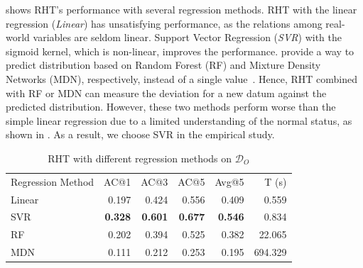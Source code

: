  shows RHT's performance with several regression methods.
RHT with the linear regression (\textit{Linear}) has unsatisfying performance, as the relations among real-world variables are seldom linear.
Support Vector Regression (\textit{SVR}) with the sigmoid kernel, which is non-linear, improves the performance.
\citeauthor{Fu:2021} provide a way to predict distribution based on Random Forest (RF) and Mixture Density Networks (MDN), respectively, instead of a single value~\cite{Fu:2021}.
Hence, RHT combined with RF or MDN can measure the deviation for a new datum against the predicted distribution.
However, these two methods perform worse than the simple linear regression due to a limited understanding of the normal status, as shown in .
As a result, we choose SVR in the empirical study.

\begin{table}[tb]
	\caption{RHT with different regression methods on $\mathcal{D}_{O}$}\label{tab:performance:oracle:regression}
	\begin{tabular}{lrrrrr}
		\toprule
		\multirow{2}{0.18\columnwidth}{Regression Method} & \multirow{2}{*}{AC@1} & \multirow{2}{*}{AC@3} & \multirow{2}{*}{AC@5} & \multirow{2}{*}{Avg@5} & \multirow{2}{0.08\columnwidth}{T (s)} \\
		& & & & & \\
		\midrule
        Linear & 0.197 & 0.424 & 0.556 & 0.409 & 0.559 \\
        SVR & \textbf{0.328} & \textbf{0.601} & \textbf{0.677} & \textbf{0.546} & 0.834 \\
        RF & 0.202 & 0.394 & 0.525 & 0.382 & 22.065 \\
        MDN & 0.111 & 0.212 & 0.253 & 0.195 & 694.329 \\
		\bottomrule
	\end{tabular}
\end{table}

